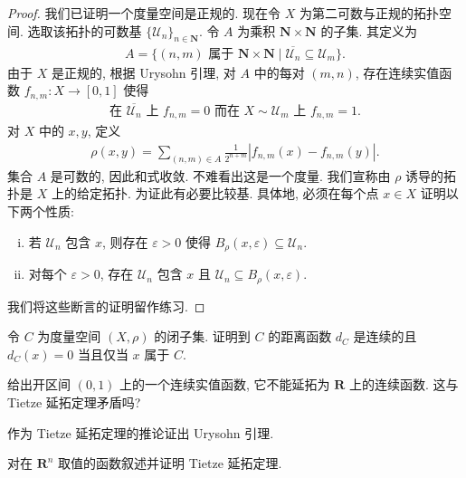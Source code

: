 \documentclass[../../main.tex]{subfiles}
\begin{document}
\begin{proof}
我们已证明一个度量空间是正规的. 现在令 $X$ 为第二可数与正规的拓扑空间. 选取该拓扑的可数基 $\{\mathcal{U}_{n}\}_{n\in\mathbf{N}}$. 令 $A$ 为乘积 $\mathbf{N}\times\mathbf{N}$ 的子集. 其定义为
\begin{align*}
A=\{(n,m)\text{ 属于 }\mathbf{N}\times\mathbf{N}\mid\overline{\mathcal{U}_{n}}\subseteq\mathcal{U}_{m}\}.
\end{align*}
由于 $X$ 是正规的, 根据 Urysohn 引理, 对 $A$ 中的每对 $(m,n)$, 存在连续实值函数 $f_{n,m}:X\to[0,1]$ 使得
\begin{align*}
\text{在 }\overline{\mathcal{U}_{n}}\text{ 上 }f_{n,m}=0\text{ 而在 }X\sim\mathcal{U}_{m}\text{ 上 }f_{n,m}=1.
\end{align*}
对 $X$ 中的 $x,y$, 定义
\begin{align}
\rho(x,y)=\sum_{(n,m)\in A}\frac{1}{2^{n+m}}\left|f_{n,m}(x)-f_{n,m}(y)\right|.\label{align:ch12-度量化rho}
\end{align}
集合 $A$ 是可数的, 因此和式收敛. 不难看出这是一个度量. 我们宣称由 $\rho$ 诱导的拓扑是 $X$ 上的给定拓扑. 为证此有必要比较基. 具体地, 必须在每个点 $x\in X$ 证明以下两个性质:
\begin{enumerate}[(i)]
\item 若 $\mathcal{U}_{n}$ 包含 $x$, 则存在 $\varepsilon>0$ 使得 $B_{\rho}(x,\varepsilon)\subseteq\mathcal{U}_{n}$.
\item 对每个 $\varepsilon>0$, 存在 $\mathcal{U}_{n}$ 包含 $x$ 且 $\mathcal{U}_{n}\subseteq B_{\rho}(x,\varepsilon)$.
\end{enumerate}
我们将这些断言的证明留作练习.
\end{proof}

\begin{exercise}\label{exercise:ch12-01}
令 $C$ 为度量空间 $(X,\rho)$ 的闭子集. 证明到 $C$ 的距离函数 $d_{C}$ 是连续的且 $d_{C}(x)=0$ 当且仅当 $x$ 属于 $C$.
\end{exercise}

\begin{exercise}\label{exercise:ch12-02}
给出开区间 $(0,1)$ 上的一个连续实值函数, 它不能延拓为 $\mathbf{R}$ 上的连续函数. 这与 Tietze 延拓定理矛盾吗?
\end{exercise}

\begin{exercise}\label{exercise:ch12-03}
作为 Tietze 延拓定理的推论证出 Urysohn 引理.
\end{exercise}

\begin{exercise}\label{exercise:ch12-04}
对在 $\mathbf{R}^{n}$ 取值的函数叙述并证明 Tietze 延拓定理.
\end{exercise}
\end{document}
